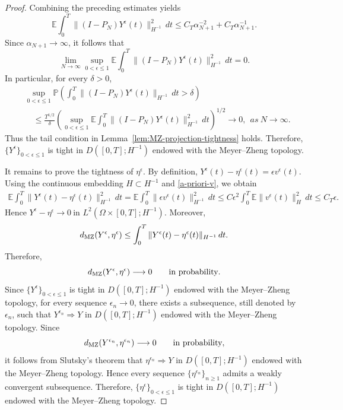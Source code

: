 \documentclass[11pt]{article}
\theoremstyle{plain}
\numberwithin{equation}{section}
\begin{document}
\begin{proof}
Combining the preceding estimates yields
\[
\mathbb E\int_0^T
\|(I-P_N)Y^\epsilon(t)\|_{H^{-1}}^2\,dt
\le
C_T\alpha_{N+1}^{-2}
+
C_T\alpha_{N+1}^{-1}.
\]
Since \(\alpha_{N+1}\to\infty\), it follows that
\[
\lim_{N\to\infty}
\sup_{0<\epsilon\le1}
\mathbb E\int_0^T
\|(I-P_N)Y^\epsilon(t)\|_{H^{-1}}^2\,dt
=0.
\]
In particular, for every \(\delta>0\),
\[
\begin{aligned}
&\sup_{0<\epsilon\le1}
\mathbb P
\left(
\int_0^T
\|(I-P_N)Y^\epsilon(t)\|_{H^{-1}}\,dt>\delta
\right)                                                     \\
&\quad\le
\frac{T^{1/2}}{\delta}
\left(
\sup_{0<\epsilon\le1}
\mathbb E\int_0^T
\|(I-P_N)Y^\epsilon(t)\|_{H^{-1}}^2\,dt
\right)^{1/2}
\longrightarrow 0,~~ as ~N\to\infty. 
\end{aligned}
\]
Thus the  tail condition in
Lemma~\ref{lem:MZ-projection-tightness} holds. Therefore, \(\{Y^\epsilon\}_{0<\epsilon\le1}\)
is tight in \(D([0,T];H^{-1})\) endowed with the Meyer--Zheng topology.

It remains to prove the tightness of
\(\eta^\epsilon\). By definition, \(Y^\epsilon(t)-\eta^\epsilon(t)=\epsilon v^\epsilon(t).\)
Using the continuous embedding \(H\subset H^{-1}\) and \eqref{a-priori-v}, we obtain
\[
\begin{aligned}
\mathbb E\int_0^T\|Y^\epsilon(t)-\eta^\epsilon(t)\|_{H^{-1}}^2\,dt
=\mathbb E\int_0^T\|\epsilon v^\epsilon(t)\|_{H^{-1}}^2\,dt                  
\le C\epsilon^2\int_0^T\mathbb E\|v^\epsilon(t)\|_H^2\,dt                
\le C_T\epsilon .
\end{aligned}
\]
Hence \(Y^\epsilon-\eta^\epsilon \longrightarrow 0 ~ \text{in }L^2(\Omega\times[0,T];H^{-1}).\)
Moreover,
\[
d_{\rm MZ}(Y^\epsilon,\eta^\epsilon) \le \int_0^T \|Y^\epsilon(t)-\eta^\epsilon(t)\|_{H^{-1}}\,dt .
\]
Therefore,
\[
d_{\rm MZ}(Y^\epsilon,\eta^\epsilon) \longrightarrow 0 \qquad \text{in probability}.
\]
Since \(\{Y^\epsilon\}_{0<\epsilon\le1}\) is tight in \(D([0,T];H^{-1})\) endowed with the Meyer--Zheng topology, for every
sequence \(\epsilon_n\to0\), there exists a subsequence, still denoted by \(\epsilon_n\), such that \(Y^{\epsilon_n}\Longrightarrow Y\)
in \(D([0,T];H^{-1})\) endowed with the Meyer--Zheng topology. Since
\[
d_{\rm MZ}(Y^{\epsilon_n},\eta^{\epsilon_n})\longrightarrow 0\qquad \text{in probability},
\]
it follows from Slutsky's theorem that \(\eta^{\epsilon_n}\Longrightarrow Y\) in \(D([0,T];H^{-1})\) endowed with the Meyer--Zheng topology. 
Hence every sequence \(\{\eta^{\epsilon_n}\}_{n\ge1}\) admits a weakly convergent subsequence. Therefore, \(\{\eta^\epsilon\}_{0<\epsilon\le1}\) 
is tight in \(D([0,T];H^{-1})\) endowed with the Meyer--Zheng topology.
 


 
\end{proof}
  
\end{document}
